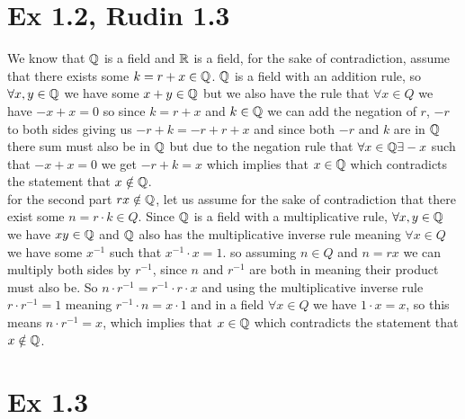 \documentclass{report}
\begin{document}
\section*{Ex 1.2, Rudin 1.3}


\begin{proofWithHibiscus}
  We know that $\mathbb{Q}$ is a field and $\mathbb{R}$ is a field, for the sake of contradiction, assume that there exists some $k = r + x \in \mathbb{Q}$. $\mathbb{Q}$ is a field with an addition rule, so $\forall x,y \in \mathbb{Q} $ we have some $x + y \in \mathbb{Q}$ but we also have the rule that $\forall x \in Q $ we have $-x + x = 0$ so since $k = r + x $ and $k \in \mathbb{Q}$ we can add the negation of $r$, $-r$ to both sides giving us $-r + k = -r + r + x$ and since both $-r$ and $k$ are in $\mathbb{Q}$ there sum must also be in $\mathbb{Q}$ but due to the negation rule that $\forall x \in \mathbb{Q} \exists -x $ such that $ - x + x = 0$ we get $-r + k = x$ which implies that $x \in \mathbb{Q}$ which contradicts the statement that $x \notin \mathbb{Q}$.  \\

  for the second part $rx \notin \mathbb{Q}$, let us assume for the sake of contradiction that there exist some $n = r \cdot k \in Q$. Since $\mathbb{Q}$ is a field with a multiplicative rule, $\forall x,y \in \mathbb{Q} $ we have $xy \in \mathbb{Q}$ and $\mathbb{Q}$ also has the multiplicative inverse rule meaning $\forall x \in Q $ we have some $x^{-1}$ such that $x^{-1} \cdot x = 1$. so assuming $n \in Q$ and $n = rx$ we can multiply both sides by $r^{-1}$, since $n $ and $r^{-1}$ are both in meaning their product must also be. So $n \cdot r^{-1} = r^{-1} \cdot r \cdot x $ and using the multiplicative inverse rule $r \cdot r^{-1} = 1 $ meaning $r^{-1} \cdot n = x \cdot 1$ and in a field $\forall x \in Q$ we have $1 \cdot x = x$, so this means $n \cdot r^{-1} = x$, which implies that $x \in \mathbb{Q}$ which contradicts the statement that $x \notin \mathbb{Q}$.
\end{proofWithHibiscus}

\section*{Ex 1.3}
\end{document}
